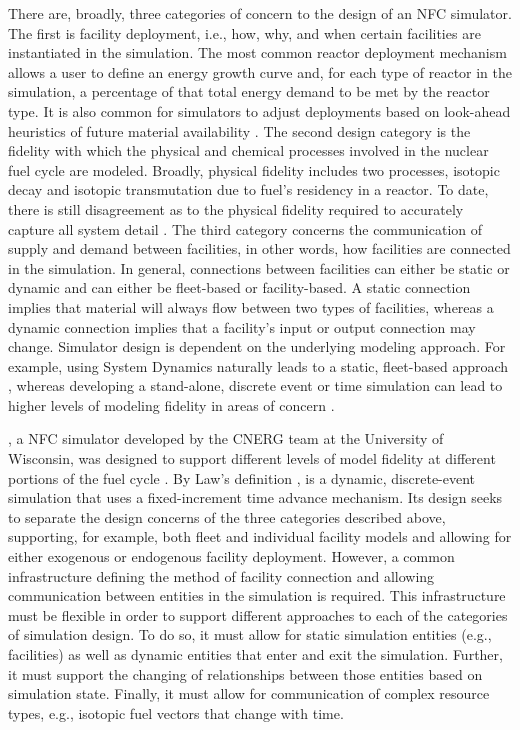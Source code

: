 There are, broadly, three categories of concern to the design of an NFC
simulator. The first is facility deployment, i.e., how, why, and when certain
facilities are instantiated in the simulation. The most common reactor
deployment mechanism allows a user to define an energy growth curve and, for
each type of reactor in the simulation, a percentage of that total energy demand
to be met by the reactor type. It is also common for simulators to adjust
deployments based on look-ahead heuristics of future material availability
\cite{schweitzer_improved_2008, van_den_durpel_daness_2009}. The second design
category is the fidelity with which the physical and chemical processes involved
in the nuclear fuel cycle are modeled. Broadly, physical fidelity includes two
processes, isotopic decay and isotopic transmutation due to fuel's residency in
a reactor. To date, there is still disagreement as to the physical fidelity
required to accurately capture all system detail \cite{guerin_impact_2009}. The
third category concerns the communication of supply and demand between
facilities, in other words, how facilities are connected in the simulation. In
general, connections between facilities can either be static or dynamic and can
either be fleet-based or facility-based. A static connection implies that
material will always flow between two types of facilities, whereas a dynamic
connection implies that a facility's input or output connection may
change. Simulator design is dependent on the underlying modeling approach. For
example, using System Dynamics \cite{forrester1971counterintuitive} naturally
leads to a static, fleet-based approach \cite{busquim_e_silva_system_2008,
  durpel_daness_2003, yacout_vision_2006}, whereas developing a stand-alone,
discrete event or time simulation \cite{Law:1999:SMA:554952} can lead to higher
levels of modeling fidelity in areas of concern \cite{schneider_nfcsim:_2005,
  mouginot2012class, boucher_cosi:_2006}.

\Cyclus, a NFC simulator developed by the CNERG team at the University of
Wisconsin, was designed to support different levels of model fidelity at
different portions of the fuel cycle \cite{huff_cyclus_2015}. By Law's
definition \cite{Law:1999:SMA:554952}, \Cyclus is a dynamic, discrete-event
simulation that uses a fixed-increment time advance mechanism. Its design seeks
to separate the design concerns of the three categories described above,
supporting, for example, both fleet and individual facility models and allowing
for either exogenous or endogenous facility deployment. However, a common
infrastructure defining the method of facility connection and allowing
communication between entities in the simulation is required. This
infrastructure must be flexible in order to support different approaches to each
of the categories of simulation design. To do so, it must allow for static
simulation entities (e.g., facilities) as well as dynamic entities that enter
and exit the simulation. Further, it must support the changing of relationships
between those entities based on simulation state. Finally, it must allow for
communication of complex resource types, e.g., isotopic fuel vectors that change
with time.

